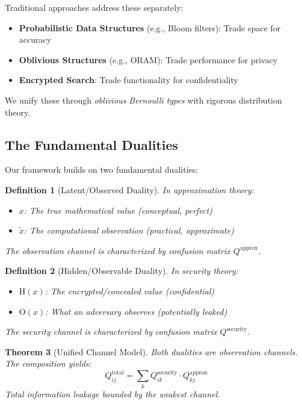 \documentclass[11pt,final]{article}
\newcommand{\latent}[1]{#1}
\newcommand{\observed}[1]{\tilde{#1}}
\newcommand{\hidden}[1]{\text{H}(#1)}
\newcommand{\observable}[1]{\text{O}(#1)}
\newtheorem{theorem}{Theorem}[section]
\newtheorem{definition}[theorem]{Definition}
\begin{document}
Traditional approaches address these separately:
\begin{itemize}
    \item \textbf{Probabilistic Data Structures} (e.g., Bloom filters): Trade space for accuracy
    \item \textbf{Oblivious Structures} (e.g., ORAM): Trade performance for privacy  
    \item \textbf{Encrypted Search}: Trade functionality for confidentiality
\end{itemize}

We unify these through \emph{oblivious Bernoulli types} with rigorous distribution theory.

\subsection{The Fundamental Dualities}

Our framework builds on two fundamental dualities:

\begin{definition}[Latent/Observed Duality]
In approximation theory:
\begin{itemize}
    \item $\latent{x}$: The true mathematical value (conceptual, perfect)
    \item $\observed{x}$: The computational observation (practical, approximate)
\end{itemize}
The observation channel is characterized by confusion matrix $Q^{\text{approx}}$.
\end{definition}

\begin{definition}[Hidden/Observable Duality]  
In security theory:
\begin{itemize}
    \item $\hidden{x}$: The encrypted/concealed value (confidential)
    \item $\observable{x}$: What an adversary observes (potentially leaked)
\end{itemize}
The security channel is characterized by confusion matrix $Q^{\text{security}}$.
\end{definition}

\begin{theorem}[Unified Channel Model]
Both dualities are observation channels. The composition yields:
\begin{equation}
Q^{\text{total}}_{ij} = \sum_k Q^{\text{security}}_{ik} \cdot Q^{\text{approx}}_{kj}
\end{equation}
Total information leakage bounded by the weakest channel.
\end{theorem}
\end{document}
